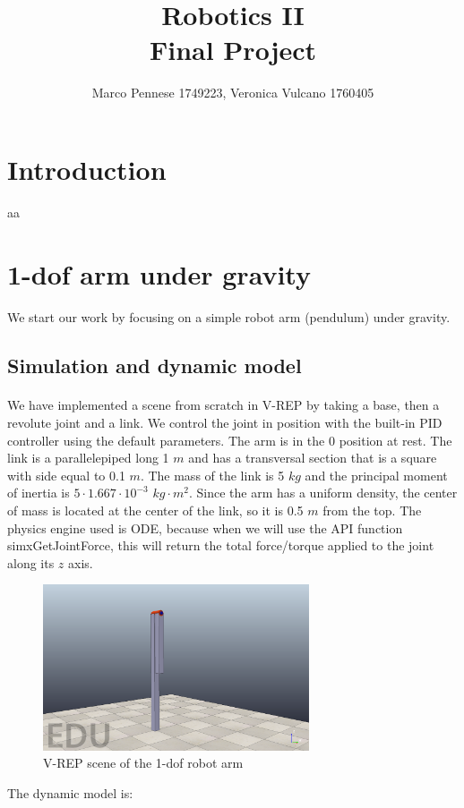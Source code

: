 \documentclass{article}
\title{\textbf{Robotics II} \\ \large{\textbf{Final Project}}}
\author{Marco Pennese 1749223, Veronica Vulcano 1760405}
\date{}
\begin{document}
\maketitle
\tableofcontents
\pagebreak

\section{Introduction}
aa
\section{1-dof arm under gravity}
\paragraph{}We start our work by focusing on a simple robot arm (pendulum) under gravity.
\subsection{Simulation and dynamic model}
\paragraph{} We have implemented a scene from scratch in V-REP by taking a base, then a revolute joint and a link. We control the joint in position with the built-in PID controller using the default parameters. The arm is in the 0 position at rest. The link is a parallelepiped long 1 $m$ and has a transversal section that is a square with side equal to 0.1 $m$. The mass of the link is 5 $kg$ and the principal moment of inertia is $5\cdot1.667\cdot10^{-3}$ $kg\cdot m^2$. Since the arm has a uniform density, the center of mass is located at the center of the link, so it is 0.5 $m$ from the top. The physics engine used is ODE, because when we will use the API function simxGetJointForce, this will return the total force/torque applied to the joint along its $z$ axis.
\begin{figure}[!htbp]
\centering
\includegraphics[width=0.7\textwidth]{images/1-dof/scene.png}
\caption{V-REP scene of the 1-dof robot arm}
\end{figure}
\FloatBarrier
The dynamic model is:
\end{document}

